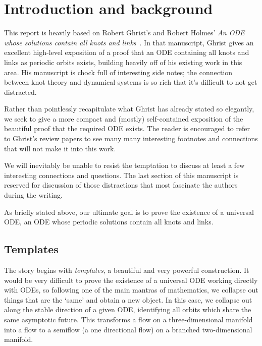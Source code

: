 \documentclass[paper.tex]{subfiles}
\begin{document}
\section{Introduction and background}


This report is heavily based on Robert Ghrist's and Robert Holmes' \emph{An ODE whose solutions contain all knots and links}~\cite{knottyode}.
 In that manuscript, Ghrist gives an excellent high-level exposition of a proof that an ODE containing
all knots and links as periodic orbits exists, building heavily off of his existing work in this area. His manuscript is chock full of interesting side notes; the connection between knot theory and dynamical systems is so rich
that it's difficult to not get distracted.

Rather than pointlessly recapitulate what Ghrist has already stated so elegantly, we seek to give a more compact and (mostly) self-contained exposition of the beautiful proof that the required ODE exists. The reader is encouraged to
refer to Ghrist's review papers \cite{knottyode}\cite{chaoticknots} to see many many interesting footnotes and connections that will not make it into this work.

We will inevitably be unable to resist the temptation to discuss at least a few interesting connections and questions. The last section of this manuscript is reserved for discussion of those distractions that most fascinate the
authors during the writing.

As briefly stated above, our ultimate goal is to prove the existence of a universal ODE, an ODE whose periodic solutions contain all knots and links.


\subsection{Templates}

The story begins with \emph{templates}, a beautiful and very powerful construction. It would be very difficult to prove the existence of a universal ODE working directly with ODEs, so following one of the main mantras
of mathematics, we collapse out things that are the `same' and obtain a new object. In this case, we collapse out along the stable direction of a given ODE, identifying all orbits which share the same asymptotic future.
This transforms a flow on a three-dimensional manifold into a flow to a semiflow (a one directional flow) on a branched two-dimensional manifold.
\end{document}

